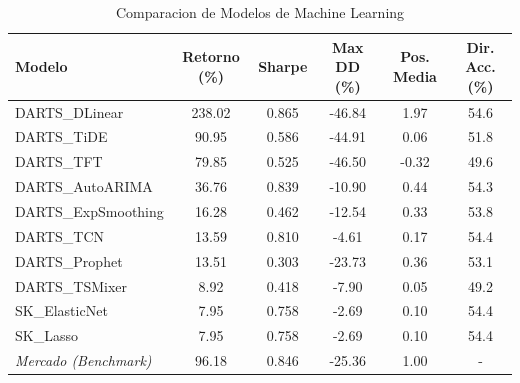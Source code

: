 \begin{table}[H]
\centering
\caption{Comparacion de Modelos de Machine Learning}
\label{tab:model_comparison}
\begin{tabular}{lccccc}
\toprule
\textbf{Modelo} & \textbf{Retorno (\%)} & \textbf{Sharpe} & \textbf{Max DD (\%)} & \textbf{Pos. Media} & \textbf{Dir. Acc. (\%)} \\
\midrule
DARTS_DLinear & 238.02 & 0.865 & -46.84 & 1.97 & 54.6 \\
DARTS_TiDE & 90.95 & 0.586 & -44.91 & 0.06 & 51.8 \\
DARTS_TFT & 79.85 & 0.525 & -46.50 & -0.32 & 49.6 \\
DARTS_AutoARIMA & 36.76 & 0.839 & -10.90 & 0.44 & 54.3 \\
DARTS_ExpSmoothing & 16.28 & 0.462 & -12.54 & 0.33 & 53.8 \\
DARTS_TCN & 13.59 & 0.810 & -4.61 & 0.17 & 54.4 \\
DARTS_Prophet & 13.51 & 0.303 & -23.73 & 0.36 & 53.1 \\
DARTS_TSMixer & 8.92 & 0.418 & -7.90 & 0.05 & 49.2 \\
SK_ElasticNet & 7.95 & 0.758 & -2.69 & 0.10 & 54.4 \\
SK_Lasso & 7.95 & 0.758 & -2.69 & 0.10 & 54.4 \\
\midrule
\textit{Mercado (Benchmark)} & 96.18 & 0.846 & -25.36 & 1.00 & - \\
\bottomrule
\end{tabular}
\end{table}
